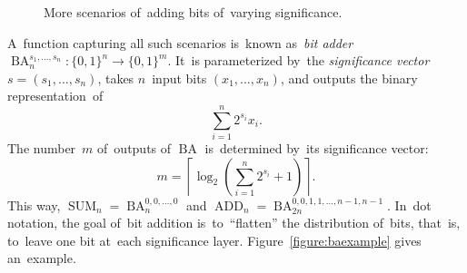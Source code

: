 \documentclass[sigconf, review, anonymous]{acmart}
\DeclareMathOperator{\SUM}{SUM}
\DeclareMathOperator{\ADD}{ADD}
\DeclareMathOperator{\BA}{BA}
\begin{document}
\begin{figure}%
	\begin{center}
	\end{center}
	\caption{More scenarios of~adding bits of~varying significance.}
	\label{figure:dot2}
\end{figure}

A~function capturing all such scenarios is~known as~\emph{bit adder}
$\BA_n^{s_1, \dotsc, s_n} \colon \{0,1\}^n \to \{0,1\}^m$. It~is parameterized by~the \emph{significance vector}
$s=(s_1, \dotsc, s_n)$, takes $n$~input bits $(x_1, \dotsc, x_n)$, and outputs
the binary representation~of
\[\sum_{i=1}^{n}2^{s_i}x_i.\]
The number~$m$ of~outputs of $\BA$ is~determined by~its significance vector:
\[m=\left\lceil \log_2\left( \sum_{i=1}^{n}2^{s_i} + 1\right) \right\rceil.\]
This way, $\SUM_n=\BA^{0,0,\dotsc,0}_n$ and $\ADD_n=\BA^{0,0,1,1,\dotsc,n-1,n-1}_{2n}$.
In~dot notation, the goal of~bit addition is~to~``flatten''
the distribution of~bits, that~is, to~leave one bit at~each significance layer.
Figure~\ref{figure:baexample} gives an~example.
\end{document}
